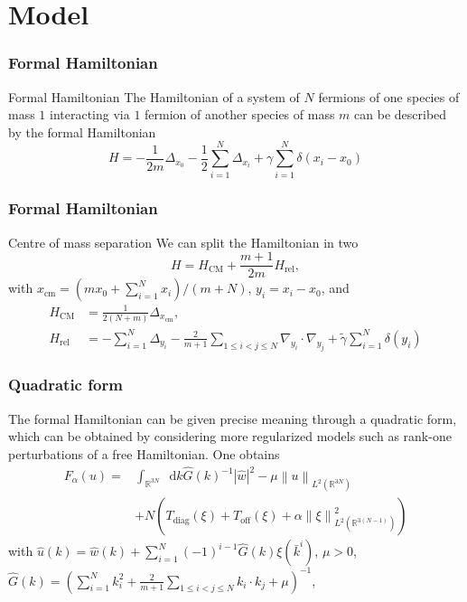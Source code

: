 \documentclass{beamer}[10]
\newcommand{\norm}[1]{\left\lVert #1 \right\rVert}
\newcommand*\diff{\mathop{}\!\mathrm{d}}
\newcommand{\R}{\mathbb{R}}
\begin{document}
\section{Model}
\begin{frame}
	\frametitle{Formal Hamiltonian}
	\begin{block}{Formal Hamiltonian}
	The Hamiltonian of a system of $ N $ fermions of one species of mass $ 1 $ interacting via	$ 1 $ fermion of another species of mass $ m $ can be described by the formal Hamiltonian\begin{equation}
	H=-\frac{1}{2m}\Delta_{x_0}-\frac{1}{2}\sum_{i=1}^{N}\Delta_{x_i}+\gamma\sum_{i=1}^{N}\delta(x_i-x_0)
	\end{equation}
	\end{block}
\end{frame}
\begin{frame} 
	\frametitle{Formal Hamiltonian}
	\begin{block}{Centre of mass separation}
		We can split the Hamiltonian in two \begin{equation}
		H=H_{\text{CM}}+\frac{m+1}{2m}H_{\text{rel}},
		\end{equation}
		with $ x_{\text{cm}}=(mx_0+\sum_{i=1}^{N}x_i)/(m+N) $, $ y_i=x_i-x_0 $, and \begin{equation}\begin{aligned}
		H_\text{CM}&=\frac{1}{2(N+m)}\Delta_{x_{\text{cm}}},\\ H_{\text{rel}}&=-\sum_{i=1}^{N}\Delta_{y_i}-\frac{2}{m+1}\sum_{1\leq i<j\leq N}\nabla_{y_i}\cdot\nabla_{y_j}+\tilde{\gamma}\sum_{i=1}^{N}\delta(y_i)
		\end{aligned}
		\end{equation}
	\end{block}
\end{frame}
\begin{frame}
	\frametitle{Quadratic form}
	The formal Hamiltonian can be given precise meaning through a quadratic form, which can be obtained by considering more regularized models such as rank-one perturbations of a free Hamiltonian. One obtains\begin{equation}
	\begin{aligned}
	F_\alpha(u)=&\int_{\R^{3N}}\diff k \hat{G}(k)^{-1}|\hat{w}|^2-\mu\norm{u}_{L^2(\R^{3N})}\\&+N\left(T_{\text{diag}}(\xi)+T_{\text{off}}(\xi)+\alpha\norm{\xi}_{L^2(\R^{3(N-1)})}^2\right)
	\end{aligned}
	\end{equation} 
	with $ \hat{u}(k)=\hat{w}(k)+\sum_{i=1}^{N}(-1)^{i-1}\hat{G}(k)\xi(\bar{k}^i) $, $ \mu>0 $, $ \hat{G}(k)=\left(\sum_{i=1}^{N}k_i^2+\frac{2}{m+1}\sum_{1\leq i<j\leq N}k_i\cdot k_j+\mu\right)^{-1} $,
\end{frame}
\end{document}
